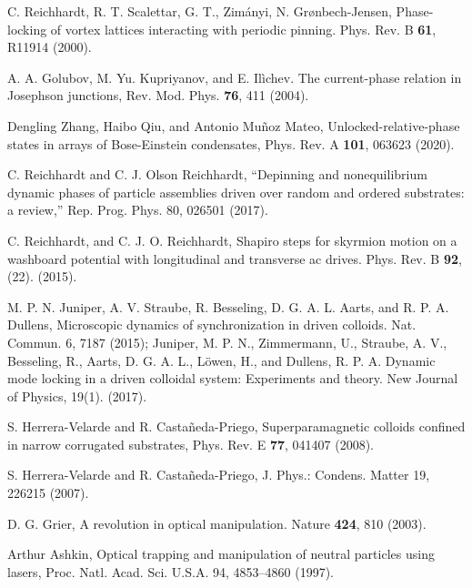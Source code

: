 \documentclass[twocolumn,preprintnumbers,amsmath,amssymb,aps,prx]{revtex4}
\begin{document}
\begin{thebibliography}{99}
 C. Reichhardt, R. T. Scalettar, G. T., Zim{\'a}nyi, N. Gr{\o}nbech-Jensen,  Phase-locking of vortex lattices interacting with periodic pinning.  Phys. Rev. B {\bf 61}, R11914 (2000).
  
     A. A. Golubov, M. Yu. Kupriyanov, and E. Il{\`i}chev. The current-phase relation in Josephson junctions, Rev. Mod. Phys. {\bf 76}, 411 (2004).

      
     Dengling Zhang, Haibo Qiu, and Antonio Mu{\~n}oz Mateo, Unlocked-relative-phase states in arrays of Bose-Einstein condensates, Phys. Rev. A {\bf 101}, 063623 (2020).

     C. Reichhardt and C. J. Olson Reichhardt, “Depinning and nonequilibrium dynamic phases of particle assemblies driven over random and ordered substrates: a review,” Rep. Prog. Phys. 80, 026501 (2017).

     C. Reichhardt, and C. J. O. Reichhardt,  Shapiro steps for skyrmion motion on a washboard potential with longitudinal and transverse ac drives. Phys. Rev. B {\bf 92}, (22). (2015).
      
     M. P. N. Juniper, A. V. Straube, R. Besseling, D. G. A. L. Aarts, and R. P. A. Dullens, Microscopic dynamics of synchronization in driven colloids. Nat. Commun. 6, 7187 (2015); 
      Juniper, M. P. N., Zimmermann, U., Straube, A. V., Besseling, R., Aarts, D. G. A. L., Löwen, H., and Dullens, R. P. A.  Dynamic mode locking in a driven colloidal system: Experiments and theory. New Journal of Physics, 19(1). (2017).  %
      
     S. Herrera-Velarde and R. Castañeda-Priego, Superparamagnetic colloids confined in narrow corrugated substrates, Phys. Rev. E {\bf 77}, 041407 (2008).

     S. Herrera-Velarde and R. Castañeda-Priego, J. Phys.: Condens. Matter 19, 226215 (2007).

     D. G. Grier, A revolution in optical manipulation. Nature {\bf 424}, 810 (2003).

      Arthur Ashkin, Optical trapping and manipulation of neutral particles using lasers, Proc. Natl. Acad. Sci. U.S.A. 94, 4853–4860 (1997).
        

\end{thebibliography}
\end{document}
